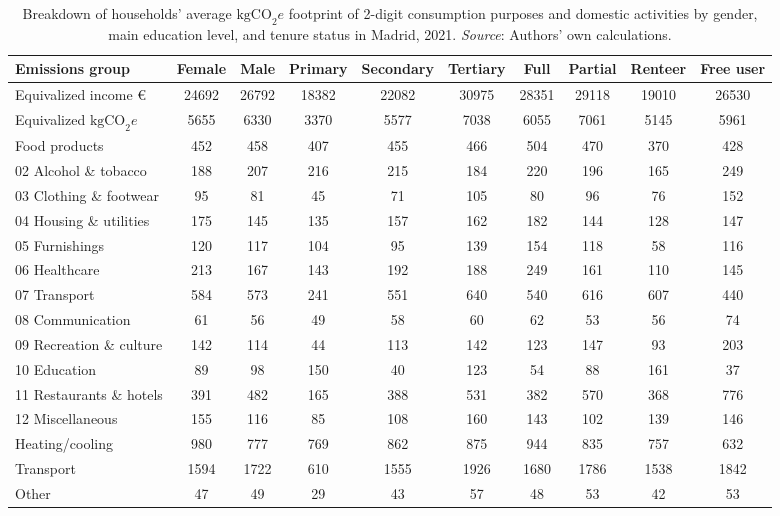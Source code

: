 \documentclass[
  10pt,
  twocolumn]{aft}
\begin{document}
\begin{table}[!ht]
\centering
\begin{tabular}[t]{lccccccccc}
\toprule
Emissions group & Female & Male & Primary & Secondary & Tertiary & Full & Partial & Renteer & Free user\\
\midrule
Equivalized income \euro{} & 24692 & 26792 & 18382 & 22082 & 30975 & 28351 & 29118 & 19010 & 26530\\
Equivalized $\text{kgCO}_2e$ & 5655 & 6330 & 3370 & 5577 & 7038 & 6055 & 7061 & 5145 & 5961\\
\addlinespace
01 Food products & 452 & 458 & 407 & 455 & 466 & 504 & 470 & 370 & 428\\
02 Alcohol \& tobacco & 188 & 207 & 216 & 215 & 184 & 220 & 196 & 165 & 249\\
03 Clothing \& footwear & 95 & 81 & 45 & 71 & 105 & 80 & 96 & 76 & 152\\
04 Housing \& utilities & 175 & 145 & 135 & 157 & 162 & 182 & 144 & 128 & 147\\
05 Furnishings & 120 & 117 & 104 & 95 & 139 & 154 & 118 & 58 & 116\\
06 Healthcare & 213 & 167 & 143 & 192 & 188 & 249 & 161 & 110 & 145\\
07 Transport & 584 & 573 & 241 & 551 & 640 & 540 & 616 & 607 & 440\\
08 Communication & 61 & 56 & 49 & 58 & 60 & 62 & 53 & 56 & 74\\
09 Recreation \& culture & 142 & 114 & 44 & 113 & 142 & 123 & 147 & 93 & 203\\
10 Education & 89 & 98 & 150 & 40 & 123 & 54 & 88 & 161 & 37\\
11 Restaurants \& hotels & 391 & 482 & 165 & 388 & 531 & 382 & 570 & 368 & 776\\
12 Miscellaneous & 155 & 116 & 85 & 108 & 160 & 143 & 102 & 139 & 146\\
\addlinespace
Heating/cooling & 980 & 777 & 769 & 862 & 875 & 944 & 835 & 757 & 632\\
Transport & 1594 & 1722 & 610 & 1555 & 1926 & 1680 & 1786 & 1538 & 1842\\
Other & 47 & 49 & 29 & 43 & 57 & 48 & 53 & 42 & 53\\
\bottomrule
\end{tabular}
\caption{Breakdown of households' average $\text{kgCO}_2e$ footprint of 2-digit consumption purposes and domestic activities by gender, main education level, and tenure status in Madrid, 2021. \textit{Source}: Authors’ own calculations.\label{tab:emissions-demographic}}
\end{table}
\end{document}
